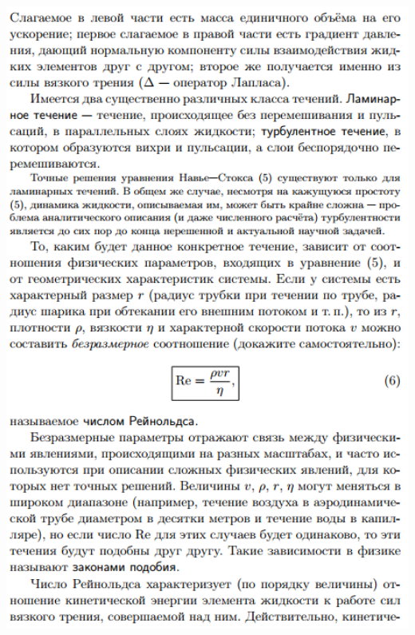 \documentclass[12pt]{article}
\begin{document}
\begin{center}
    	\includegraphics[width=16cm]{theory_3.png}

\end{center}
\end{document}
